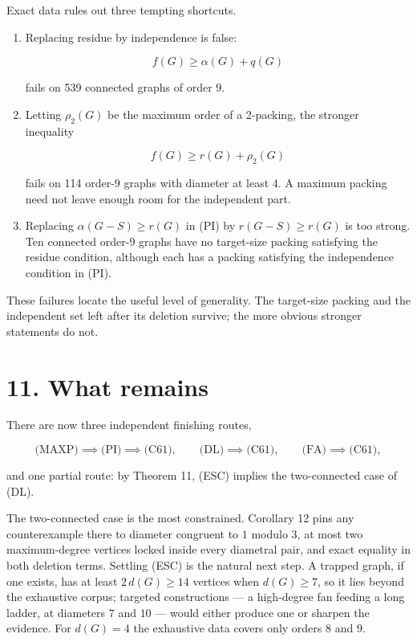 \documentclass[
  11pt,
  letterpaper,
]{article}
\begin{document}
Exact data rules out three tempting shortcuts.

\begin{enumerate}
\def\labelenumi{\arabic{enumi}.}
\item
  Replacing residue by independence is false:

  \[
  f(G)\ge\alpha(G)+q(G)
  \]

  fails on 539 connected graphs of order \(9\).
\item
  Letting \(\rho_2(G)\) be the maximum order of a 2-packing, the
  stronger inequality

  \[
  f(G)\ge r(G)+\rho_2(G)
  \]

  fails on 114 order-\(9\) graphs with diameter at least \(4\). A
  maximum packing need not leave enough room for the independent part.
\item
  Replacing \(\alpha(G-S)\ge r(G)\) in (PI) by \(r(G-S)\ge r(G)\) is too
  strong. Ten connected order-\(9\) graphs have no target-size packing
  satisfying the residue condition, although each has a packing
  satisfying the independence condition in (PI).
\end{enumerate}

These failures locate the useful level of generality. The target-size
packing and the independent set left after its deletion survive; the
more obvious stronger statements do not.

\section{11. What remains}\label{what-remains}

There are now three independent finishing routes,

\[
\text{(MAXP)}\implies\text{(PI)}\implies\text{(C61)},
\qquad
\text{(DL)}\implies\text{(C61)},
\qquad
\text{(FA)}\implies\text{(C61)},
\]

and one partial route: by Theorem 11, (ESC) implies the two-connected
case of (DL).

The two-connected case is the most constrained. Corollary 12 pins any
counterexample there to diameter congruent to \(1\) modulo \(3\), at
most two maximum-degree vertices locked inside every diametral pair, and
exact equality in both deletion terms. Settling (ESC) is the natural
next step. A trapped graph, if one exists, has at least \(2\,d(G)\ge14\)
vertices when \(d(G)\ge7\), so it lies beyond the exhaustive corpus;
targeted constructions --- a high-degree fan feeding a long ladder, at
diameters \(7\) and \(10\) --- would either produce one or sharpen the
evidence. For \(d(G)=4\) the exhaustive data covers only orders \(8\)
and \(9\).
\end{document}
